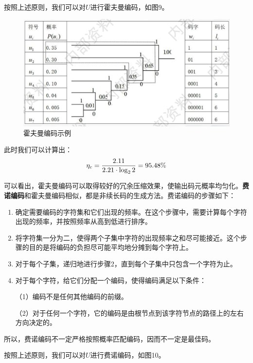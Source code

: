 \documentclass[UTF8,a4paper,11pt]{article}
\begin{document}
按照上述原则，我们可以对$U$进行霍夫曼编码，如图9。
\begin{figure}[htbp]
\centering
\includegraphics[scale=0.45]{p9.png}
\caption{霍夫曼编码示例}
\end{figure}

此时我们可以计算出：
\begin{equation}
\notag
\eta_c=\frac{2.11}{2.21\cdot\log_{2}{2}}=95.48\%
\end{equation}

可以看出，霍夫曼编码可以取得较好的冗余压缩效果，使输出码元概率均匀化。\textbf{费诺编码}和霍夫曼编码相似，都是非续长码的生成方法。费诺编码的步骤如下：

\begin{enumerate}
\item 确定需要编码的字符集和它们出现的频率。在这个步骤中，需要计算每个字符出现的频率，并按照频率从高到低进行排序。

\item 将字符集一分为二，使得两个子集中字符的出现频率之和尽可能接近。这个步骤的目的是将编码的负担尽可能平均地分摊到每个字符上。

\item 对于每个子集，递归地进行步骤2，直到每个子集中只包含一个字符为止。

\item 对于每个字符，给它们分配一个编码，使得编码满足以下条件：

（1）编码不是任何其他编码的前缀。

（2）对于任何一个字符，它的编码是由根节点到该字符节点的路径上的左右方向决定的。
\end{enumerate}

所以，费诺编码不一定严格按照概率匹配编码，因而不一定是最佳码。

按照上述原则，我们可以对$U$进行费诺编码，如图10。
\end{document}
